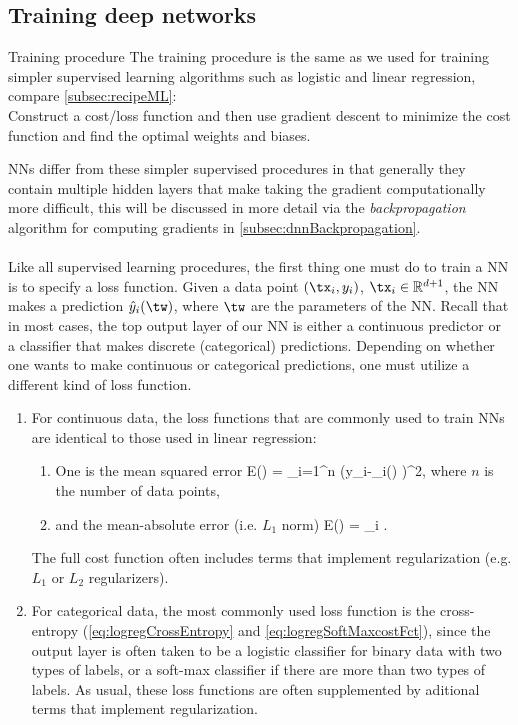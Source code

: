 \subsection{Training deep networks}
\label{subsec:dnnTraining}
\begin{mybox}{Training procedure}
	The training procedure is the same as we used for training simpler supervised learning algorithms such as logistic and linear regression, compare \ref{subsec:recipeML}:\\
	Construct a cost/loss function and then use gradient descent to minimize the cost function and find the optimal weights and biases. 
\end{mybox}
NNs differ from these simpler supervised procedures in that generally they contain multiple hidden layers that make taking the gradient computationally more difficult, this will be discussed in more detail via the \emph{backpropagation} algorithm for computing gradients in \ref{subsec:dnnBackpropagation}.\\
\\
Like all supervised learning procedures, the first thing one must do to train a NN is to specify a loss function. Given a data point $(\tx_i,y_i)$, $\tx_i \in \mR^{d+1}$, the NN makes a prediction $\hat{y}_i(\tw)$, where $\tw$ are the parameters of the NN. Recall that in most cases, the top output layer of our NN is either a continuous predictor or a classifier that makes discrete (categorical) predictions. Depending on whether one wants to make continuous or categorical predictions, one must utilize a different kind of loss function.
\begin{enumerate} 
\item For continuous data, the loss functions that are commonly used to train NNs are identical to those used in linear regression:
\begin{enumerate}
	\item One is the mean squared error
	\be 
	\label{eq:dnnCostSquaredError}
	E(\tw) = \sum_{i=1}^n (y_i-_i(\tw) )^2, 
	\ee 
	where $n$ is the number of data points,
	\item and the mean-absolute error (i.e. $L_1$ norm) 
	\be 
	\label{eq:dnnCostAbsoluteError} 
	E(\tw) =  \sum_i .
		\ee 
\end{enumerate}
The full cost function often includes terms that implement regularization (e.g. $L_1$ or $L_2$ regularizers).
\item For categorical data, the most commonly used loss function is the cross-entropy (\ref{eq:logregCrossEntropy} and \ref{eq:logregSoftMaxcostFct}), since the output layer is often taken to be a logistic classifier for binary data with two types of labels, or a soft-max classifier if there are more than two types of labels. As usual, these loss functions are often supplemented by aditional terms that implement regularization.
\end{enumerate}
